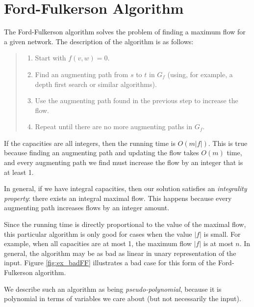 \documentclass{article}
\begin{document}
\section{Ford-Fulkerson Algorithm}
The Ford-Fulkerson algorithm solves the
problem of finding a maximum flow for a given network. The description
of the algorithm is as follows: 

\begin{quote}
\begin{enumerate}
  \item
    Start with $f(v,w) = 0$.
  \item
    Find an augmenting path from $s$ to $t$ in $G_f$ (using, for example, a depth
    first search or similar algorithms).
  \item
    Use the augmenting path found in the previous step to increase the flow.
  \item
    Repeat until there are no more augmenting paths in $G_f$.
\end{enumerate}
\end{quote}

If the capacities are all integers, then the running time is
$O(m|f|)$.  This is true because finding an augmenting path and
updating the flow takes $O(m)$ time, and every augmenting path we find
must increase the flow by an integer that is at least 1.

In general, if we have integral capacities, then our solution
satisfies an {\em integrality property}: there exists an integral
maximal flow.  This happens because every augmenting path increases
flows by an integer amount.


Since the running time is directly proportional to the value of the
maximal flow, this particular algorithm is only good for cases when
the value $|f|$ is small.  For example, when all capacities are at most
1, the maximum flow $|f|$ is at most $n$.  In general, the algorithm
may be as bad as linear in unary representation of the input.  Figure
\ref{fig:ex_badFF} illustrates a bad case for this form of the
Ford-Fulkerson algorithm.  


We describe such an algorithm as being {\em pseudo-polynomial},
because it is polynomial in terms of variables we care about (but not
necessarily the input).
\end{document}
